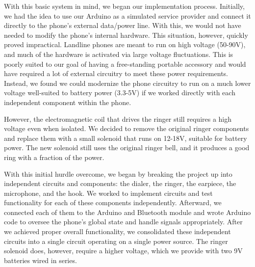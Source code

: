 \documentclass{es50report}
\begin{document}
        With this basic system in mind, we began our implementation process. Initially, we had the idea to use our Arduino as a simulated service provider and connect it directly to the phone's external data/power line. With this, we would not have needed to modify the phone's internal hardware. This situation, however, quickly proved impractical. Landline phones are meant to run on high voltage (50-90V), and much of the hardware is activated via large voltage fluctuations. This is poorly suited to our goal of having a free-standing portable accessory and would have required a lot of external circuitry to meet these power requirements. Instead, we found we could modernize the phone circuitry to run on a much lower voltage well-suited to battery power (3.3-5V) if we worked directly with each independent component within the phone.

        However, the electromagnetic coil that drives the ringer still requires a high voltage even when isolated. We decided to remove the original ringer components and replace them with a small solenoid that runs on 12-18V, suitable for battery power. The new solenoid still uses the original ringer bell, and it produces a good ring with a fraction of the power.

        With this initial hurdle overcome, we began by breaking the project up into independent circuits and components: the dialer, the ringer, the earpiece, the microphone, and the hook. We worked to implement circuits and test functionality for each of these components independently. Afterward, we connected each of them to the Arduino and Bluetooth module and wrote Arduino code to oversee the phone's global state and handle signals appropriately. After we achieved proper overall functionality, we consolidated these independent circuits into a single circuit operating on a single power source. The ringer solenoid does, however, require a higher voltage, which we provide with two 9V batteries wired in series.
\end{document}
